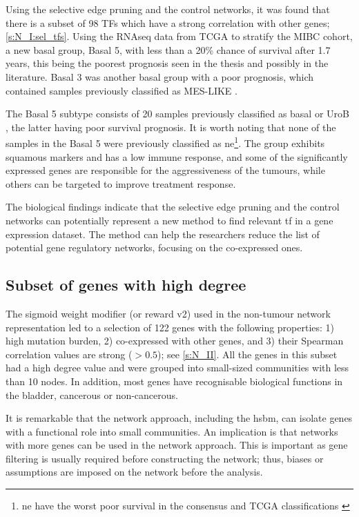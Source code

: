Using the selective edge pruning and the control networks, it was found that there is a subset of 98 TFs which have a strong correlation with other genes; \cref{s:N_I:sel_tfs}. Using the RNAseq data from TCGA to stratify the MIBC cohort, a new basal group, Basal 5, with less than a 20\% chance of survival after 1.7 years, this being the poorest prognosis seen in the thesis and possibly in the literature. Basal 3 was another basal group with a poor prognosis, which contained samples previously classified as \gls{MES-LIKE} \citep{Marzouka2018-ge}.

The Basal 5 subtype consists of 20 samples previously classified as basal \citep{Kamoun2020-tj,Robertson2017-mg} or UroB \citep{Marzouka2018-ge}, the latter having poor survival prognosis. It is worth noting that none of the samples in the Basal 5 were previously classified as \acrlong{ne}\footnote{\acrlong{ne} have the worst poor survival in the consensus and TCGA classifications \citep{Kamoun2020-tj,Robertson2017-mg}}. The group exhibits squamous markers and has a low immune response, and some of the significantly expressed genes are responsible for the aggressiveness of the tumours, while others can be targeted to improve treatment response.

The biological findings indicate that the selective edge pruning and the control networks can potentially represent a new method to find relevant \acrfull{tf} in a gene expression dataset. The method can help the researchers reduce the list of potential gene regulatory networks, focusing on the co-expressed ones.

\subsection*{Subset of genes with high degree}

The sigmoid weight modifier (or reward v2) used in the non-tumour network representation led to a selection of 122 genes with the following properties: 1) high mutation burden, 2) co-expressed with other genes, and 3) their Spearman correlation values are strong (\(>0.5\)); see \cref{s:N_II}. All the genes in this subset had a high degree value and were grouped into small-sized communities with less than 10 nodes. In addition, most genes have recognisable biological functions in the bladder, cancerous or non-cancerous.

It is remarkable that the network approach, including the \acrshort{hsbm}, can isolate genes with a functional role into small communities. An implication is that networks with more genes can be used in the network approach. This is important as gene filtering is usually required before constructing the network; thus, biases or assumptions are imposed on the network before the analysis.

